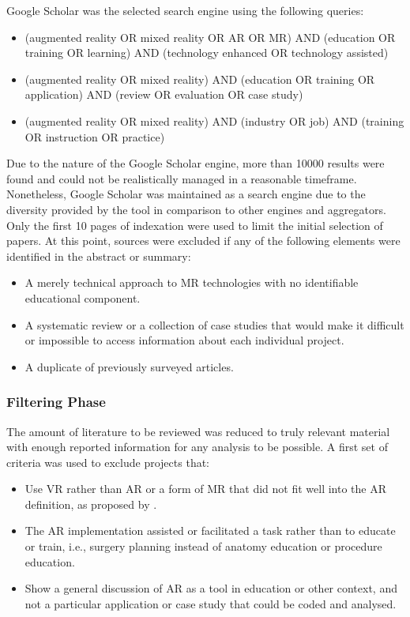 Google Scholar was the selected search engine using the following queries:

\begin{itemize}
    \item (augmented reality OR mixed reality OR AR OR MR) AND (education OR training OR learning) AND (technology enhanced OR technology assisted)
    \item (augmented reality OR mixed reality) AND (education OR training OR application) AND (review OR evaluation OR case study)
    \item (augmented reality OR mixed reality) AND (industry OR job) AND (training OR instruction OR practice)
\end{itemize}

Due to the nature of the Google Scholar engine, more than 10000 results were found and could not be realistically managed in a reasonable timeframe. Nonetheless, Google Scholar was
maintained as a search engine due to the diversity provided by the tool in comparison to other engines and aggregators. Only the first 10 pages of indexation were used to limit the initial
selection of papers. At this point, sources were excluded if any of the following elements were identified in the abstract or summary:

\begin{itemize}
    \item A merely technical approach to \ac{MR} technologies with no identifiable educational component.
    \item A systematic review or a collection of case studies that would make it difficult or impossible to access information about each individual project.
    \item A duplicate of previously surveyed articles.
\end{itemize}

\subsubsection{Filtering Phase \label{sec:2-2-2-2}}

The amount of literature to be reviewed was reduced to truly relevant material with enough reported information for any analysis to be possible. A first set of criteria was used to exclude
projects that:

\begin{itemize}
    \item Use \ac{VR} rather than \ac{AR} or a form of \ac{MR} that did not fit well into the \ac{AR} definition, as proposed by \textcite{milgram_1995}.
    \item The \ac{AR} implementation assisted or facilitated a task rather than to educate or train, i.e., surgery planning instead of anatomy education or procedure education.
    \item Show a general discussion of \ac{AR} as a tool in education or other context, and not a particular application or case study that could be coded and analysed.
\end{itemize}

